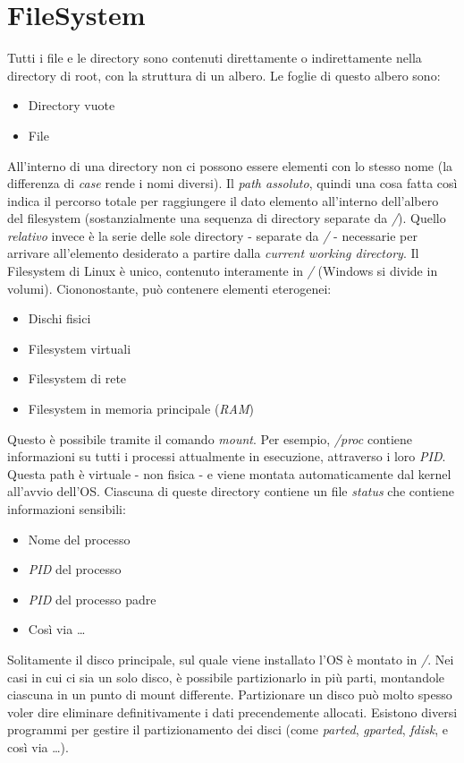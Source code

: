 \section{FileSystem}
Tutti i file e le directory sono contenuti direttamente o indirettamente nella directory di root, con la struttura di un albero.
Le foglie di questo albero sono:
\begin{itemize}
    \item Directory vuote
    \item File
\end{itemize}
All'interno di una directory non ci possono essere elementi con lo stesso nome (la differenza di \textit{case} rende i nomi diversi).
Il \textit{path assoluto}, quindi una cosa fatta così indica il percorso totale per raggiungere il dato elemento all'interno dell'albero del filesystem (sostanzialmente una sequenza di directory separate da \textit{/}). Quello \textit{relativo} invece è la serie delle sole directory - separate da \textit{/} - necessarie per arrivare all'elemento desiderato a partire dalla \textit{current working directory}.
Il Filesystem di Linux è unico, contenuto interamente in \textit{/} (Windows si divide in volumi).
Ciononostante, può contenere elementi eterogenei:
\begin{itemize}
    \item Dischi fisici
    \item Filesystem virtuali
    \item Filesystem di rete
    \item Filesystem in memoria principale (\textit{RAM})
\end{itemize}
Questo è possibile tramite il comando \textit{mount}.
Per esempio, \textit{/proc} contiene informazioni su tutti i processi attualmente in esecuzione, attraverso i loro  \textit{PID}. Questa path è virtuale - non fisica - e viene montata automaticamente dal kernel all'avvio dell'OS. Ciascuna di queste directory contiene un file \textit{status} che contiene informazioni sensibili:
\begin{itemize}
    \item Nome del processo
    \item \textit{PID} del processo
    \item \textit{PID} del processo padre
    \item Così via \ldots
\end{itemize}
Solitamente il disco principale, sul quale viene installato l'OS è montato in \textit{/}.
Nei casi in cui ci sia un solo disco, è possibile partizionarlo in più parti, montandole ciascuna in un punto di mount differente. Partizionare un disco può molto spesso voler dire eliminare definitivamente i dati precendemente allocati. Esistono diversi programmi per gestire il partizionamento dei disci (come \textit{parted}, \textit{gparted}, \textit{fdisk}, e così via \ldots).
